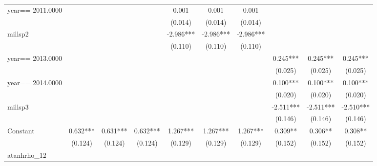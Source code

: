 \begin{table}[htbp]
\begin{tabular}{l*{9}{c}}
year==  2011.0000   &               &               &               &       0.001   &       0.001   &       0.001   &               &               &               \\
                    &               &               &               &     (0.014)   &     (0.014)   &     (0.014)   &               &               &               \\
millsp2             &               &               &               &      -2.986***&      -2.986***&      -2.986***&               &               &               \\
                    &               &               &               &     (0.110)   &     (0.110)   &     (0.110)   &               &               &               \\
year==  2013.0000   &               &               &               &               &               &               &       0.245***&       0.245***&       0.245***\\
                    &               &               &               &               &               &               &     (0.025)   &     (0.025)   &     (0.025)   \\
year==  2014.0000   &               &               &               &               &               &               &       0.100***&       0.100***&       0.100***\\
                    &               &               &               &               &               &               &     (0.020)   &     (0.020)   &     (0.020)   \\
millsp3             &               &               &               &               &               &               &      -2.511***&      -2.511***&      -2.510***\\
                    &               &               &               &               &               &               &     (0.146)   &     (0.146)   &     (0.146)   \\
Constant            &       0.632***&       0.631***&       0.632***&       1.267***&       1.267***&       1.267***&       0.309** &       0.306** &       0.308** \\
                    &     (0.124)   &     (0.124)   &     (0.124)   &     (0.129)   &     (0.129)   &     (0.129)   &     (0.152)   &     (0.152)   &     (0.152)   \\
\hline
atanhrho\_12         &               &               &               &               &               &               &               &               &               \\

\end{tabular}
\end{table}
